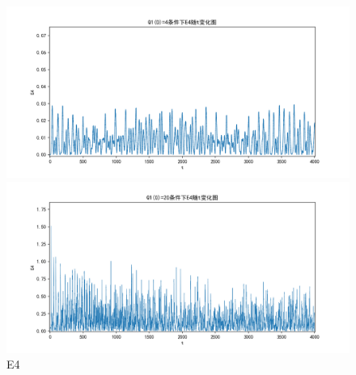\documentclass[10pt, a4paper]{article}
\begin{document}
    \begin{figure}[H]
        \begin{minipage}[t]{0.49\textwidth}
            \centering
            \includegraphics[width=\textwidth]{./q5_pics/cmp/E4.png}
        \end{minipage}
        \begin{minipage}[t]{0.49\textwidth}
            \centering
            \includegraphics[width=\textwidth]{./q5_pics/exp/E4.png}
        \end{minipage}
        \caption{E4}\label{fig:E4 in q5}
    \end{figure}
\end{document}
